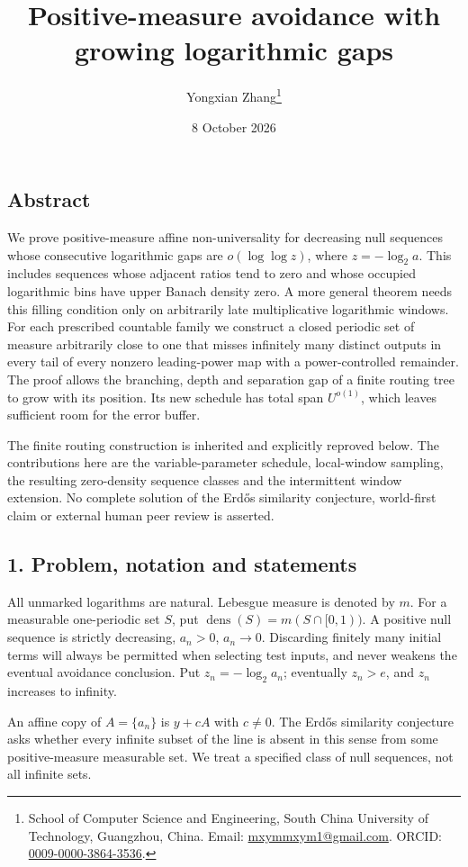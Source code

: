 \documentclass[
  11pt,
]{article}
\title{Positive-measure avoidance with growing logarithmic gaps}
\author{Yongxian Zhang\thanks{School of Computer Science and Engineering,
South China University of Technology, Guangzhou, China.
Email: \href{mailto:mxymmxym1@gmail.com}{mxymmxym1@gmail.com}.
ORCID: \href{https://orcid.org/0009-0000-3864-3536}{0009-0000-3864-3536}.}}
\date{8 October 2026}
\begin{document}
\maketitle

\subsection{Abstract}\label{abstract}

We prove positive-measure affine non-universality for decreasing null
sequences whose consecutive logarithmic gaps are \(o(\log\log z)\),
where \(z=-\log_2 a\). This includes sequences whose adjacent ratios
tend to zero and whose occupied logarithmic bins have upper Banach
density zero. A more general theorem needs this filling condition only
on arbitrarily late multiplicative logarithmic windows. For each
prescribed countable family we construct a closed periodic set of
measure arbitrarily close to one that misses infinitely many distinct
outputs in every tail of every nonzero leading-power map with a
power-controlled remainder. The proof allows the branching, depth and
separation gap of a finite routing tree to grow with its position. Its
new schedule has total span \(U^{o(1)}\), which leaves sufficient room
for the error buffer.

The finite routing construction is inherited and explicitly reproved
below. The contributions here are the variable-parameter schedule,
local-window sampling, the resulting zero-density sequence classes and
the intermittent window extension. No complete solution of the Erdős
similarity conjecture, world-first claim or external human peer review
is asserted.

\subsection{1. Problem, notation and
statements}\label{problem-notation-and-statements}

All unmarked logarithms are natural. Lebesgue measure is denoted by
\(m\). For a measurable one-periodic set \(S\), put
\(\operatorname{dens}(S)=m(S\cap[0,1))\). A positive null sequence is
strictly decreasing, \(a_n>0\), \(a_n\to 0\). Discarding finitely many
initial terms will always be permitted when selecting test inputs, and
never weakens the eventual avoidance conclusion. Put
\(z_n=-\log_2 a_n\); eventually \(z_n>e\), and \(z_n\) increases to
infinity.

An affine copy of \(A=\{a_n\}\) is \(y+cA\) with \(c\ne 0\). The Erdős
similarity conjecture asks whether every infinite subset of the line is
absent in this sense from some positive-measure measurable set. We treat
a specified class of null sequences, not all infinite sets.
\end{document}
